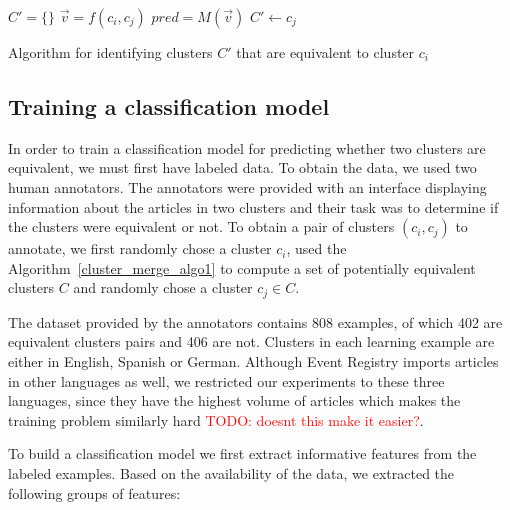 \documentclass[twoside,11pt]{article}
\newcommand{\todo}[1]{\textcolor{red}{TODO: #1}}
\begin{document}
\begin{algorithm}[tb!]

$C' = \{\}$\;
 {
    $\vec{v} = f(c_i, c_j)$\;
    $pred = M(\vec{v})$\;
     {
        $C' \leftarrow c_j$
    }
}
\caption{Algorithm for identifying clusters $C'$ that are equivalent to cluster $c_i$}
\label{cluster_merge_algo2}
\end{algorithm}

\subsection{Training a classification model}

In order to train a classification model for predicting whether two clusters are equivalent, we must first have labeled data. To obtain the data, we used two human annotators. The annotators were provided with an interface displaying information about the articles in two clusters and their task was to determine if the clusters were equivalent or not. To obtain a pair of clusters $(c_i, c_j)$ to annotate, we first randomly chose a cluster $c_i$, used the Algorithm~\ref{cluster_merge_algo1} to compute a set of potentially equivalent clusters $C$ and randomly chose a cluster $c_j \in C$.

The dataset provided by the annotators contains 808 examples, of which 402 are equivalent clusters pairs and 406 are not. Clusters in each learning example are either in English, Spanish or German. Although Event Registry imports articles in other languages as well, we restricted our experiments to these three languages, since they have the highest volume of articles which makes the training problem similarly hard \todo{doesnt this make it easier?}.

To build a classification model we first extract  informative features from the labeled examples. Based on the availability of the data, we extracted the following groups of features:
\end{document}

